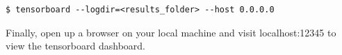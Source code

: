 \begin{lstlisting}
$ tensorboard --logdir=<results_folder> --host 0.0.0.0
\end{lstlisting}

Finally, open up a browser on your local machine and visit localhost:12345 to view the tensorboard dashboard. 

\begin{enumerate}[(a)]

	

	

  

  

  

\end{enumerate}